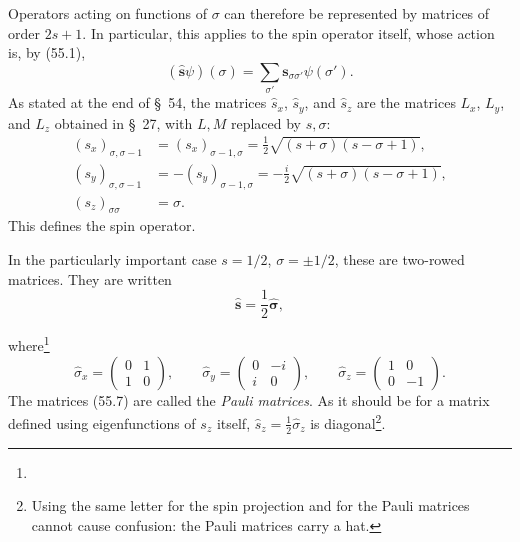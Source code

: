 Operators acting on functions of $\sigma$ can therefore be represented by
matrices of order $2s+1$. In particular, this applies to the spin operator
itself, whose action is, by (55.1),
\begin{equation}
 (\hat{\mathbf s}\psi)(\sigma)=
 \sum_{\sigma'}\mathbf s_{\sigma\sigma'}\psi(\sigma').
 \tag{55.4}
\end{equation}
As stated at the end of \S~54, the matrices $\hat s_x$, $\hat s_y$, and
$\hat s_z$ are the matrices $L_x$, $L_y$, and $L_z$ obtained in \S~27, with
$L,M$ replaced by $s,\sigma$:
\begin{equation}
 \begin{aligned}
 (s_x)_{\sigma,\sigma-1}&=(s_x)_{\sigma-1,\sigma}
   =\frac12\sqrt{(s+\sigma)(s-\sigma+1)},\\
 (s_y)_{\sigma,\sigma-1}&=-(s_y)_{\sigma-1,\sigma}
   =-\frac i2\sqrt{(s+\sigma)(s-\sigma+1)},\\
 (s_z)_{\sigma\sigma}&=\sigma.
 \end{aligned}
 \tag{55.5}
\end{equation}
This defines the spin operator.

In the particularly important case $s=1/2$, $\sigma=\pm1/2$, these are
two-rowed matrices. They are written
\begin{equation}
 \hat{\mathbf s}=\frac12\hat{\boldsymbol\sigma},
 \tag{55.6}
\end{equation}

where\footnote{}
\begin{equation}
 \hat\sigma_x=\begin{pmatrix}0&1\\1&0\end{pmatrix},\qquad
 \hat\sigma_y=\begin{pmatrix}0&-i\\i&0\end{pmatrix},\qquad
 \hat\sigma_z=\begin{pmatrix}1&0\\0&-1\end{pmatrix}.
 \tag{55.7}
\end{equation}
The matrices (55.7) are called the \emph{Pauli matrices}. As it should be for
a matrix defined using eigenfunctions of $s_z$ itself,
$\hat s_z=\frac12\hat\sigma_z$ is diagonal\footnote{Using the same letter for
the spin projection and for the Pauli matrices cannot cause confusion: the
Pauli matrices carry a hat.}.

